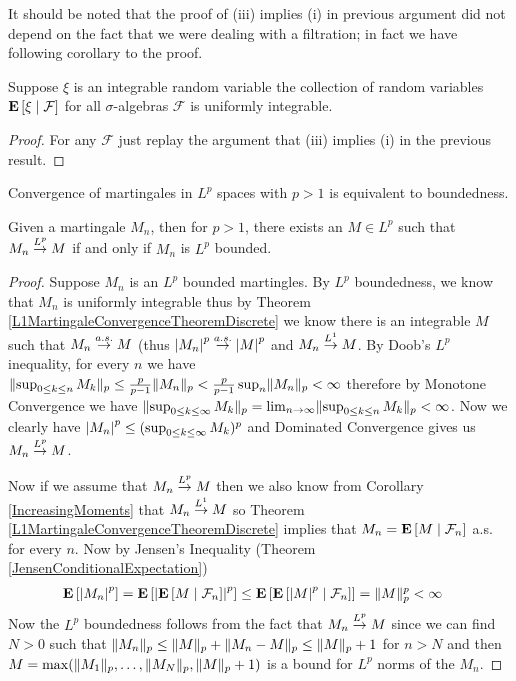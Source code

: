 It should be noted that the proof of (iii) implies (i) in previous
argument did not depend on the fact that we were dealing with a
filtration; in fact we have following corollary to the proof.
\begin{cor}\label{ConditionalExpectationsUniformlyIntegrable}Suppose $\xi$ is an integrable random variable the
  collection of random variables $\cexpectationlong{\mathcal{F}}{\xi}$
  for all $\sigma$-algebras $\mathcal{F}$ is uniformly integrable.
\end{cor}
\begin{proof}For any $\mathcal{F}$ just replay the argument that (iii) implies (i) in the
  previous result.
\end{proof}

Convergence of martingales in $L^p$ spaces with $p > 1$ is equivalent
to boundedness.
\begin{thm}\label{LpMartingaleConvergenceDiscrete}Given a
  martingale $M_n$, then for $p > 1$, there exists an $M \in L^p$ such that $M_n
  \tolp{p} M$ if and only if $M_n$ is $L^p$ bounded.
\end{thm}
\begin{proof}
Suppose $M_n$ is an $L^p$ bounded martingles.  By $L^p$ boundedness,
we know that $M_n$ is uniformly integrable thus by Theorem
\ref{L1MartingaleConvergenceTheoremDiscrete}
we know there is an integrable $M$ such that $M_n \toas M$ (thus $\abs{M_n}^p \toas \abs{M}^p$ and $M_n
\tolp{1} M$.  By Doob's $L^p$ inequality, for every $n$ we have
$\norm{\sup_{0 \leq k \leq n}M_k}_p \leq \frac{p}{p-1} \norm{M_n}_p <
\frac{p}{p-1} \sup_n \norm{M_n}_p < \infty$ therefore by Monotone
Convergence we have $\norm{\sup_{0 \leq k \leq \infty}M_k}_p = \lim_{n
  \to \infty}\norm{\sup_{0 \leq k \leq n}M_k}_p < \infty$.  Now we
clearly have $\abs{M_n}^p \leq (\sup_{0 \leq k \leq \infty}M_k)^p$ and
Dominated Convergence gives us $M_n \tolp{p} M$.

Now if we assume that $M_n \tolp{p} M$ then we also know from
Corollary \ref{IncreasingMoments} that $M_n
\tolp{1} M$ so Theorem \ref{L1MartingaleConvergenceTheoremDiscrete}
implies that $M_n = \cexpectationlong{\mathcal{F}_n}{M}$ a.s. for
every $n$.  Now by Jensen's Inequality (Theorem \ref{JensenConditionalExpectation})
\begin{align*}
\expectation{\abs{M_n}^p} &=
\expectation{\abs{\cexpectationlong{\mathcal{F}_n}{M}}^p} \leq 
\expectation{\cexpectationlong{\mathcal{F}_n}{\abs{M}^p}} =
\norm{M}_p^p < \infty
\end{align*}
Now the $L^p$ boundedness follows from the fact that $M_n \tolp{p} M$
since we can find $N>0$ such that $\norm{M_n}_p \leq \norm{M}_p +
\norm{M_n-M}_p \leq \norm{M}_p + 1$ for $n > N$ and then $M =
\max(\norm{M_1}_p, \dotsc, \norm{M_N}_p,  \norm{M}_p + 1)$ is a bound
for $L^p$ norms of the $M_n$.
\end{proof}

